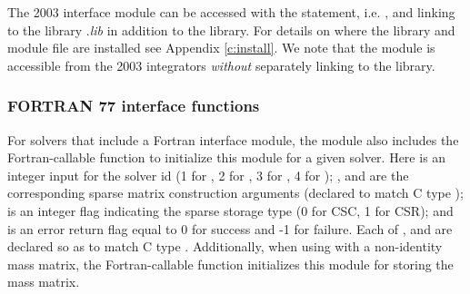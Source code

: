 The {\F} 2003 {\sunmatsparse} interface module can be accessed with the 
statement, i.e. , and linking to the library
.{\em lib} in addition to the {\CC} library.
For details on where the library and module file
 are installed see Appendix \ref{c:install}.
We note that the module is accessible from the {\F} 2003 {\sundials} integrators
\textit{without} separately linking to the
 library.

\subsubsection*{FORTRAN 77 interface functions}
For solvers that include a Fortran interface module, the {\sunmatsparse}
module also includes the Fortran-callable
function  to
initialize this {\sunmatsparse} module for a given {\sundials} solver.
Here  is an integer input for the solver id (1 for {\cvode},
2 for {\ida}, 3 for {\kinsol}, 4 for {\arkode}); , 
and  are the corresponding sparse matrix construction
arguments (declared to match C type );  is an integer flag indicating the sparse
storage type (0 for CSC, 1 for CSR); and  is an error return
flag equal to 0 for success and -1 for failure. Each of ,
 and  are declared so as to match C
type . Additionally, when using {\arkode} with a non-identity
mass matrix, the Fortran-callable
function  
initializes this {\sunmatsparse} module for storing the mass matrix.
